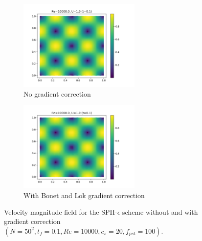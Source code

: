 \begin{figure}[htbp!]
  \begin{subfigure}{7cm}
  \centering\includegraphics[width=6cm]{Code-Figures/mon2017/grad_corr/c0_20_tait_pec_dtmul_1_mkc_no_nx_50_pst_10_re_10000_mon2017/final_vmag.png}
  \caption{No gradient correction}
  \end{subfigure}
  \begin{subfigure}{7cm}
  \centering\includegraphics[width=6cm]{Code-Figures/mon2017/grad_corr/c0_20_tait_pec_dtmul_1_mkc_yes_nx_50_pst_10_re_10000_mon2017/final_vmag.png}
  \caption{With Bonet and Lok gradient correction}
  \end{subfigure}
  \caption{Velocity magnitude field for the SPH-$\epsilon$ scheme without and with gradient correction $(N=50^2, t_f=0.1, Re=10000, c_s=20, f_{pst}=100)$.}
  \label{fig:sph-eps-grad-corr-vmag}
\end{figure}

